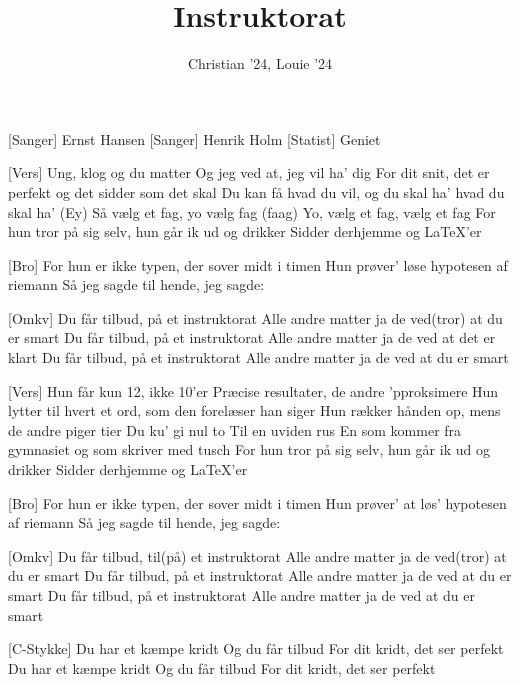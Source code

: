 \documentclass[a4paper,11pt]{article}
\title{Instruktorat}
\author{Christian '24, Louie '24}
\begin{document}
\maketitle

\begin{roles}
[Sanger] Ernst Hansen
[Sanger] Henrik Holm
[Statist] Geniet
\end{roles}

\begin{song}
    [Vers] Ung, klog og du matter
Og jeg ved at, jeg vil ha' dig
For dit snit, det er perfekt og det sidder som det skal
Du kan få hvad du vil, og du skal ha' hvad du skal ha' (Ey)
Så vælg et fag, yo vælg fag (faag)
Yo, vælg et fag, vælg et fag
For hun tror på sig selv, hun går ik ud og drikker
Sidder derhjemme og LaTeX'er

    [Bro] For hun er ikke typen, der sover midt i timen
Hun prøver' løse hypotesen af riemann
Så jeg sagde til hende, jeg sagde:

    [Omkv] Du får tilbud, på et instruktorat
Alle andre matter ja de ved(tror) at du er smart
Du får tilbud, på et instruktorat
Alle andre matter ja de ved at det er klart
Du får tilbud, på et instruktorat
Alle andre matter ja de ved at du er smart

    [Vers] Hun får kun 12, ikke 10'er
Præcise resultater, de andre 'pproksimere
Hun lytter til hvert et ord, som den forelæser han siger
Hun rækker hånden op, mens de andre piger tier
Du ku' gi nul to
Til en uviden rus
En som kommer fra gymnasiet og som skriver med tusch
For hun tror på sig selv, hun går ik ud og drikker
Sidder derhjemme og LaTeX'er

    [Bro] For hun er ikke typen, der sover midt i timen
Hun prøver' at løs' hypotesen af riemann
Så jeg sagde til hende, jeg sagde:

    [Omkv] Du får tilbud, til(på) et instruktorat
Alle andre matter ja de ved(tror) at du er smart
Du får tilbud, på et instruktorat
Alle andre matter ja de ved at du er smart
Du får tilbud, på et instruktorat
Alle andre matter ja de ved at du er smart

 [C-Stykke]
Du har et kæmpe kridt
Og du får tilbud
For dit kridt, det ser perfekt
Du har et kæmpe kridt
Og du får tilbud
For dit kridt, det ser perfekt


\end{song}
\end{document}

